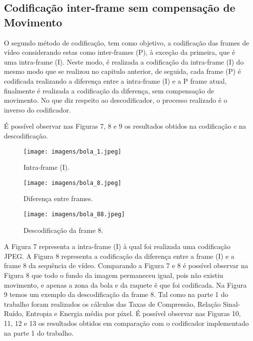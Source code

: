 \documentclass[12pt,a4paper]{article}
\begin{document}
\subsection{Codificação inter-frame sem compensação de Movimento}
O segundo método de codificação, tem como objetivo, a codificação das frames de vídeo considerando estas como inter-frames (P), à exceção da primeira, que é uma intra-frame (I). Neste modo, é realizada a codificação da intra-frame (I) do mesmo modo que se realizou no capitulo anterior, de seguida, cada frame (P) é codificada realizando a diferença entre a intra-frame (I) e a P frame atual, finalmente é realizada a codificação da diferença, sem compensação de movimento. No que diz respeito ao descodificador, o processo realizado é o inverso do codificador.

É possível observar nas Figuras 7, 8 e 9 os resultados obtidos na codificação e na descodificação. 

\begin{figure}[h]
	\centering
    \begin{minipage}{0.45\textwidth}
        \centering
        \texttt{[image: imagens/bola\_1.jpeg]}
        \caption{Intra-frame (I).}
    \end{minipage}\hfill
    \begin{minipage}{0.45\textwidth}
        \centering
        \texttt{[image: imagens/bola\_8.jpeg]}
        \caption{Diferença entre frames.}
    \end{minipage}
    \begin{minipage}{0.45\textwidth}
        \centering
        \texttt{[image: imagens/bola\_88.jpeg]}
        \caption{Descodificação da frame 8.}
    \end{minipage}
\end{figure}

A Figura 7 representa a intra-frame (I) à qual foi realizada uma codificação JPEG. A Figura 8 representa a codificação da diferença entre a frame (I) e a frame 8 da sequência de vídeo. Comparando a Figura 7 e 8 é possível observar na Figura 8 que todo o fundo da imagem permaneceu igual, pois não existiu movimento, e apenas a zona da bola e da raquete é que foi codificada. Na Figura 9 temos um exemplo da descodificação da frame 8.
\newpage
Tal como na parte 1 do trabalho foram realizados os cálculos das Taxas de Compressão, Relação Sinal-Ruído, Entropia e Energia média por píxel. É possível observar nas Figuras 10, 11, 12 e 13 os resultados obtidos em comparação com o codificador implementado na parte 1 do trabalho.
\end{document}
